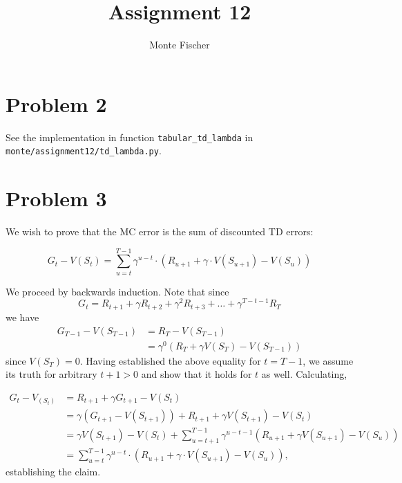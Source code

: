 \documentclass{article}
\title{Assignment 12}
\author{Monte Fischer}
\begin{document}
\maketitle

\section*{Problem 2}

See the implementation in function \texttt{tabular\_td\_lambda} in \texttt{monte/assignment12/td\_lambda.py}.

\section*{Problem 3}

We wish to prove that the MC error is the sum of discounted TD errors:

\begin{equation}
    G_t - V(S_t) = \sum_{u=t}^{T-1} \gamma^{u-t} \cdot (R_{u+1} + \gamma \cdot V(S_{u+1}) - V(S_u))
\end{equation}

We proceed by backwards induction. Note that since
\begin{equation}
    G_t = R_{t+1} + \gamma R_{t+2} + \gamma^2 R_{t+3} + \dots + \gamma^{T-t-1} R_T
\end{equation}
we have
\begin{align*}
    G_{T-1} - V(S_{T-1}) &= R_T - V(S_{T-1}) \\
    &= \gamma^0 (R_T + \gamma V(S_T) - V(S_{T-1}))
\end{align*}
since $V(S_T) = 0$. Having established the above equality for $t=T-1$, we assume its truth for arbitrary $t + 1 > 0$ and show that it holds for $t$ as well. Calculating,

\begin{align}
    G_t - V_(S_t) &= R_{t+1} + \gamma G_{t+1} - V(S_t)\\
    &= \gamma (G_{t+1} - V(S_{t+1})) + R_{t+1} + \gamma V(S_{t+1}) - V(S_t)\\
    &= \gamma V(S_{t+1}) - V(S_t) + \sum_{u=t+1}^{T-1}\gamma^{u-t-1} (R_{u+1} + \gamma V(S_{u+1}) - V(S_u))\\
    &= \sum_{u=t}^{T-1} \gamma^{u-t} \cdot (R_{u+1} + \gamma \cdot V(S_{u+1}) - V(S_u)),
\end{align}
establishing the claim.
\end{document}

